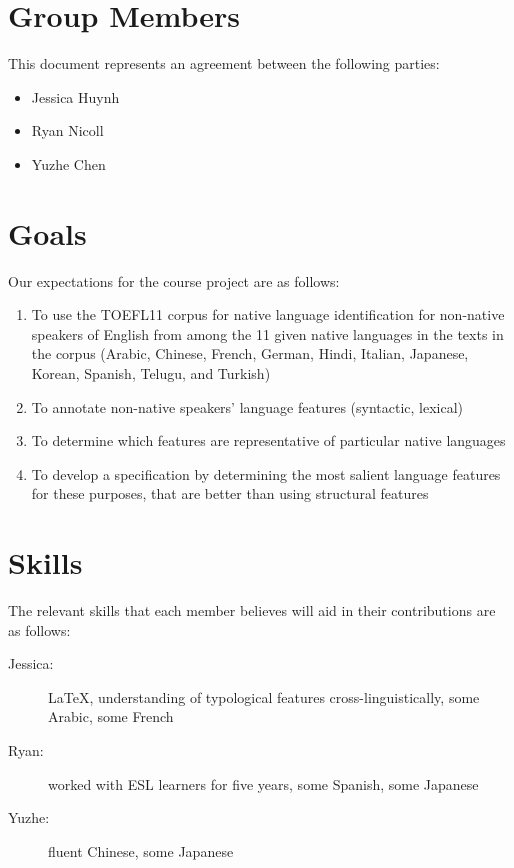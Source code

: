\documentclass{article}
\newcommand{\groupmember}[1]{#1}
\begin{document}
\section{Group Members} %
\label{par:group_members}
This document represents an agreement between the following parties:
\begin{itemize}
    \item \groupmember{Jessica Huynh}
    \item \groupmember{Ryan Nicoll}
    \item \groupmember{Yuzhe Chen}
\end{itemize}

\section{Goals} %
\label{par:expectations}
Our expectations for the course project are as follows:
\begin{enumerate}
    \item To use the TOEFL11 corpus for native language identification for non-native speakers of English from among the 11 given native languages in the texts in the corpus (Arabic, Chinese, French, German, Hindi, Italian, Japanese, Korean, Spanish, Telugu, and Turkish)
    \item To annotate non-native speakers' language features (syntactic, lexical)
    \item To determine which features are representative of particular native languages
    \item To develop a specification by determining the most salient language features for these purposes, that are better than using structural features
\end{enumerate}

\section{Skills} %
\label{sec:skills}

The relevant skills that each member believes will aid in their contributions are as follows:

\begin{description}
    \item[\groupmember{Jessica}:] \LaTeX, understanding of typological features cross-linguistically, some Arabic, some French
    \item[\groupmember{Ryan}:] worked with ESL learners for five years, some Spanish, some Japanese
    \item[\groupmember{Yuzhe}:] fluent Chinese, some Japanese
\end{description}
\end{document}
